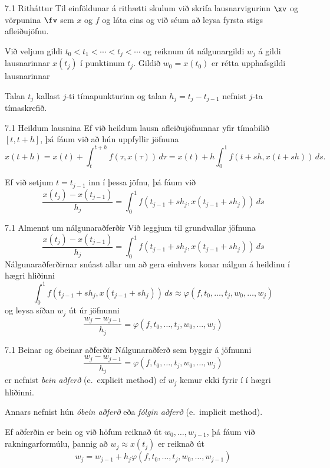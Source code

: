 \begin{frame}{7.1 Ritháttur} 
Til einföldunar á rithætti skulum við skrifa lausnarvigurinn $\xv$ 
og vörpunina $\fv$ sem $x$ og $f$ og láta eins og við séum að leysa 
fyrsta stigs afleiðujöfnu.

\pause
\smallskip
Við veljum gildi $t_0 < t_1 < \cdots < t_j<\cdots$ og reiknum út
nálgunargildi $w_j$ á gildi lausnarinnar $x(t_j)$ í punktinum
$t_j$.   Gildið $w_0=x(t_0)$ er rétta upphafsgildi lausnarinnar 

\smallskip
Talan $t_j$ kallast $j$-ti tímapunkturinn og talan
$h_j=t_j-t_{j-1}$ nefnist $j$-ta tímaskrefið.
\end{frame}


\begin{frame}{7.1 Heildum lausnina}
Ef við heildum lausn afleiðujöfnunnar yfir tímabilið 
$[t,t+h]$, þá fáum við að hún uppfyllir jöfnuna
$$
x(t+h)=x(t)+\int_t^{t+h}f(\tau,x(\tau))\, d\tau
=x(t)+h\int_0^1f(t+sh,x(t+sh))\, ds.
$$

\pause
\smallskip
Ef við setjum $t=t_{j-1}$ inn í þessa jöfnu, þá fáum við
$$
\dfrac{x(t_j)-x(t_{j-1})}{h_j}=\int_0^1f(t_{j-1}+sh_j,x(t_{j-1}+sh_j))\, ds
$$
\end{frame}


\begin{frame}{7.1 Almennt um nálgunaraðferðir} 
Við leggjum til grundvallar jöfnuna
$$
  \dfrac{x(t_j)-x(t_{j-1})}{h_j}=\int_0^1f(t_{j-1}+sh_j,x(t_{j-1}+sh_j))\, ds
$$
Nálgunaraðferðirnar snúast allar um að gera einhvers konar nálgun á
heildinu í hægri hliðinni
$$
  \int_0^1f(t_{j-1}+sh_j,x(t_{j-1}+sh_j))\, ds
  \approx \varphi(f,t_0,\dots,t_j,w_0,\dots,w_j)
$$
og leysa síðan $w_j$ út úr jöfnunni 
$$
  \dfrac{w_j-w_{j-1}}{h_j}=\varphi(f,t_0,\dots,t_j,w_0,\dots,w_j)
$$
\end{frame}


\begin{frame}{7.1 Beinar og óbeinar aðferðir} 
Nálgunaraðferð sem byggir á jöfnunni
$$
  \dfrac{w_j-w_{j-1}}{h_j}=\varphi(f,t_{0},\dots,t_j,w_{0},\dots,w_j)
$$
er nefnist {\it bein aðferð} (e.~explicit method) ef 
$w_j$ kemur ekki fyrir í í hægri hliðinni.  

\smallskip
Annars nefnist hún  {\it óbein aðferð} eða {\it fólgin aðferð} 
(e.~implicit method).

\smallskip
Ef aðferðin er bein og við höfum reiknað út $w_0,\dots,w_{j-1}$,
þá fáum við rakningarformúlu, þannig að 
$w_j\approx x(t_j)$ er reiknað út
$$
  w_j=w_{j-1}+h_j\varphi(f,t_{0},\dots,t_j,w_{0},\dots,w_{j-1})
$$
\end{frame}


